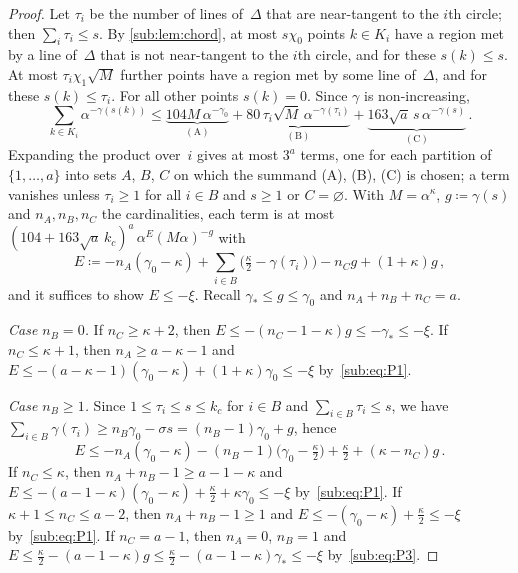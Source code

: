 \documentclass[11pt,letterpaper]{article}
\begin{document}
\begin{proof}
Let $\tau_i$ be the number of lines of~$\Delta$ that are near-tangent to the $i$th circle; then $\sum_i\tau_i\le s$. By \cref{sub:lem:chord}, at most $s\chi_0$ points $k\in K_i$ have a region met by a line of~$\Delta$ that is not near-tangent to the $i$th circle, and for these $s(k)\le s$. At most $\tau_i\chi_1\sqrt M$ further points have a region met by some line of~$\Delta$, and for these $s(k)\le\tau_i$. For all other points $s(k)=0$. Since $\gamma$ is non-increasing,
\begin{equation*}
  \sum_{k\in K_i}\alpha^{-\gamma(s(k))}\le\underbrace{104M\,\alpha^{-\gamma_0}}_{\mathrm{(A)}}+\underbrace{80\,\tau_i\sqrt M\,\alpha^{-\gamma(\tau_i)}}_{\mathrm{(B)}}+\underbrace{163\sqrt a\,s\,\alpha^{-\gamma(s)}}_{\mathrm{(C)}}\,.
\end{equation*}
Expanding the product over~$i$ gives at most $3^a$ terms, one for each partition of $\{1,\dots,a\}$ into sets $A$, $B$, $C$ on which the summand (A), (B), (C) is chosen; a term vanishes unless $\tau_i\ge1$ for all $i\in B$ and $s\ge1$ or $C=\varnothing$. With $M=\alpha^\kappa$, $g\coloneqq\gamma(s)$ and $n_A,n_B,n_C$ the cardinalities, each term is at most $(104+163\sqrt a\,k_c)^a\,\alpha^{E}(M\alpha)^{-g}$ with
\begin{equation*}
  E\coloneqq-n_A(\gamma_0-\kappa)+\sum_{i\in B}\bigl(\tfrac\kappa2-\gamma(\tau_i)\bigr)-n_Cg+(1+\kappa)g\,,
\end{equation*}
and it suffices to show $E\le-\xi$. Recall $\gamma_*\le g\le\gamma_0$ and $n_A+n_B+n_C=a$.

\emph{Case $n_B=0$.} If $n_C\ge\kappa+2$, then $E\le-(n_C-1-\kappa)g\le-\gamma_*\le-\xi$. If $n_C\le\kappa+1$, then $n_A\ge a-\kappa-1$ and $E\le-(a-\kappa-1)(\gamma_0-\kappa)+(1+\kappa)\gamma_0\le-\xi$ by~\eqref{sub:eq:P1}.

\emph{Case $n_B\ge1$.} Since $1\le\tau_i\le s\le k_c$ for $i\in B$ and $\sum_{i\in B}\tau_i\le s$, we have $\sum_{i\in B}\gamma(\tau_i)\ge n_B\gamma_0-\sigma s=(n_B-1)\gamma_0+g$, hence
\begin{equation*}
  E\le-n_A(\gamma_0-\kappa)-(n_B-1)\bigl(\gamma_0-\tfrac\kappa2\bigr)+\tfrac\kappa2+(\kappa-n_C)g\,.
\end{equation*}
If $n_C\le\kappa$, then $n_A+n_B-1\ge a-1-\kappa$ and $E\le-(a-1-\kappa)(\gamma_0-\kappa)+\frac\kappa2+\kappa\gamma_0\le-\xi$ by~\eqref{sub:eq:P1}. If $\kappa+1\le n_C\le a-2$, then $n_A+n_B-1\ge1$ and $E\le-(\gamma_0-\kappa)+\frac\kappa2\le-\xi$ by~\eqref{sub:eq:P1}. If $n_C=a-1$, then $n_A=0$, $n_B=1$ and $E\le\frac\kappa2-(a-1-\kappa)g\le\frac\kappa2-(a-1-\kappa)\gamma_*\le-\xi$ by~\eqref{sub:eq:P3}.
\end{proof}
\end{document}
